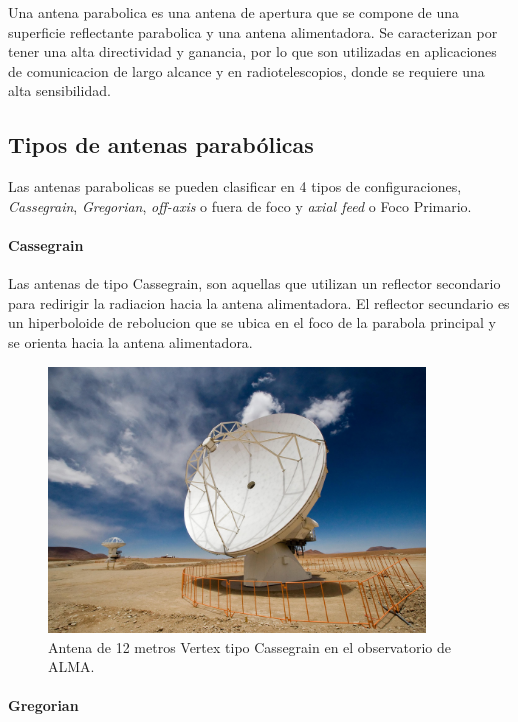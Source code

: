 Una antena parabolica es una antena de apertura que se compone de una superficie reflectante parabolica y una antena alimentadora. Se caracterizan por tener una alta directividad y ganancia, por lo que son utilizadas en aplicaciones de comunicacion de largo alcance y en radiotelescopios, donde se requiere una alta sensibilidad.\\


\subsection{Tipos de antenas parabólicas}

Las antenas parabolicas se pueden clasificar en 4 tipos de configuraciones, \textit{Cassegrain}, \textit{Gregorian}, \textit{off-axis} o fuera de foco y \textit{axial feed} o Foco Primario.\\

\paragraph{Cassegrain}

Las antenas de tipo Cassegrain, son aquellas que utilizan un reflector secondario para redirigir la radiacion hacia la antena alimentadora. El reflector secundario es un hiperboloide de rebolucion que se ubica en el foco de la parabola principal y se orienta hacia la antena alimentadora.

\begin{figure}
    \centering
    \includegraphics[width = 10cm]{img/cassegrain.jpg}
    \caption{Antena de 12 metros Vertex tipo Cassegrain en el observatorio de ALMA.}
    \label{fig:cass}
\end{figure}

\paragraph{Gregorian}


